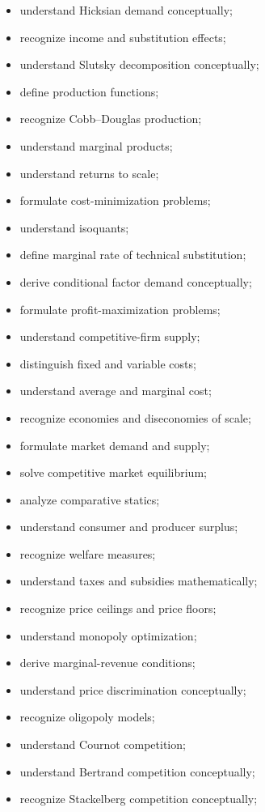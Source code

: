 {\begin{itemize}
    \item understand Hicksian demand conceptually;
    \item recognize income and substitution effects;
    \item understand Slutsky decomposition conceptually;
    \item define production functions;
    \item recognize Cobb--Douglas production;
    \item understand marginal products;
    \item understand returns to scale;
    \item formulate cost-minimization problems;
    \item understand isoquants;
    \item define marginal rate of technical substitution;
    \item derive conditional factor demand conceptually;
    \item formulate profit-maximization problems;
    \item understand competitive-firm supply;
    \item distinguish fixed and variable costs;
    \item understand average and marginal cost;
    \item recognize economies and diseconomies of scale;
    \item formulate market demand and supply;
    \item solve competitive market equilibrium;
    \item analyze comparative statics;
    \item understand consumer and producer surplus;
    \item recognize welfare measures;
    \item understand taxes and subsidies mathematically;
    \item recognize price ceilings and price floors;
    \item understand monopoly optimization;
    \item derive marginal-revenue conditions;
    \item understand price discrimination conceptually;
    \item recognize oligopoly models;
    \item understand Cournot competition;
    \item understand Bertrand competition conceptually;
    \item recognize Stackelberg competition conceptually;

\end{itemize}}
